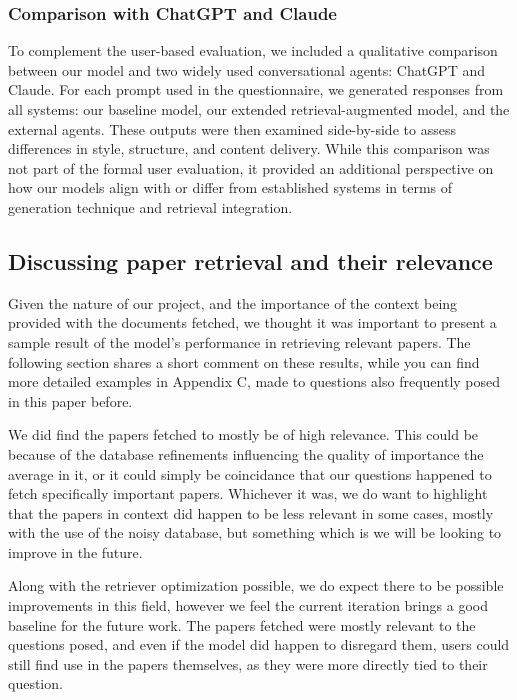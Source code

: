 \documentclass[fleqn,moreauthors,10pt]{ds_report}
\begin{document}
\subsubsection*{Comparison with ChatGPT and Claude}

To complement the user-based evaluation, we included a qualitative comparison between our model and two widely used conversational agents: ChatGPT and Claude. For each prompt used in the questionnaire, we generated responses from all systems: our baseline model, our extended retrieval-augmented model, and the external agents. These outputs were then examined side-by-side to assess differences in style, structure, and content delivery. While this comparison was not part of the formal user evaluation, it provided an additional perspective on how our models align with or differ from established systems in terms of generation technique and retrieval integration.



\subsection*{Discussing paper retrieval and their relevance}

Given the nature of our project, and the importance of the context being provided with the documents fetched, we thought it was important to present a sample result of the model's performance in retrieving relevant papers. The following section shares a short comment on these results, while you can find more detailed examples in Appendix C, made to questions also frequently posed in this paper before.

We did find the papers fetched to mostly be of high relevance. This could be because of the database refinements influencing the quality of importance the average in it, or it could simply be coincidance that our questions happened to fetch specifically important papers. Whichever it was, we do want to highlight that the papers in context did happen to be less relevant in some cases, mostly with the use of the noisy database, but something which is we will be looking to improve in the future.

Along with the retriever optimization possible, we do expect there to be possible improvements in this field, however we feel the current iteration brings a good baseline for the future work. The papers fetched were mostly relevant to the questions posed, and even if the model did happen to disregard them, users could still find use in the papers themselves, as they were more directly tied to their question.
\end{document}
